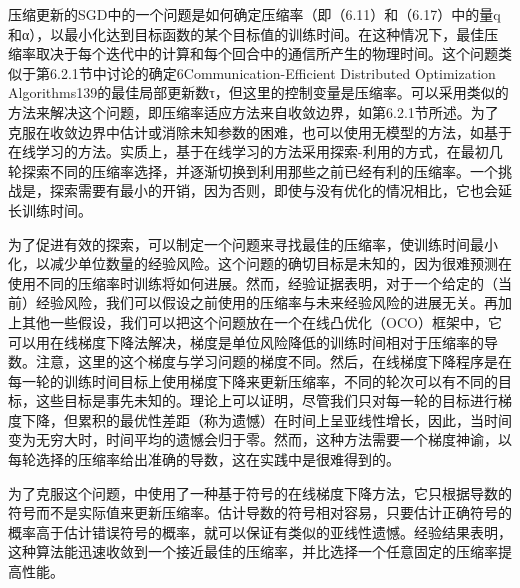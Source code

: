 {压缩更新的SGD中的一个问题是如何确定压缩率（即（6.11）和（6.17）中的量q和α），以最小化达到目标函数的某个目标值的训练时间。在这种情况下，最佳压缩率取决于每个迭代中的计算和每个回合中的通信所产生的物理时间。这个问题类似于第6.2.1节中讨论的确定6Communication-Efficient Distributed Optimization Algorithms139的最佳局部更新数τ，但这里的控制变量是压缩率。可以采用类似的方法来解决这个问题，即压缩率适应方法来自收敛边界，如第6.2.1节所述。为了克服在收敛边界中估计或消除未知参数的困难，也可以使用无模型的方法，如基于在线学习的方法。实质上，基于在线学习的方法采用探索-利用的方式，在最初几轮探索不同的压缩率选择，并逐渐切换到利用那些之前已经有利的压缩率。一个挑战是，探索需要有最小的开销，因为否则，即使与没有优化的情况相比，它也会延长训练时间。
	
为了促进有效的探索，可以制定一个问题来寻找最佳的压缩率，使训练时间最小化，以减少单位数量的经验风险。这个问题的确切目标是未知的，因为很难预测在使用不同的压缩率时训练将如何进展。然而，经验证据表明，对于一个给定的（当前）经验风险，我们可以假设之前使用的压缩率与未来经验风险的进展无关。再加上其他一些假设，我们可以把这个问题放在一个在线凸优化（OCO）框架中，它可以用在线梯度下降法解决，梯度是单位风险降低的训练时间相对于压缩率的导数。注意，这里的这个梯度与学习问题的梯度不同。然后，在线梯度下降程序是在每一轮的训练时间目标上使用梯度下降来更新压缩率，不同的轮次可以有不同的目标，这些目标是事先未知的。理论上可以证明，尽管我们只对每一轮的目标进行梯度下降，但累积的最优性差距（称为遗憾）在时间上呈亚线性增长，因此，当时间变为无穷大时，时间平均的遗憾会归于零。然而，这种方法需要一个梯度神谕，以每轮选择的压缩率给出准确的导数，这在实践中是很难得到的。
	
为了克服这个问题，中使用了一种基于符号的在线梯度下降方法，它只根据导数的符号而不是实际值来更新压缩率。估计导数的符号相对容易，只要估计正确符号的概率高于估计错误符号的概率，就可以保证有类似的亚线性遗憾。经验结果表明，这种算法能迅速收敛到一个接近最佳的压缩率，并比选择一个任意固定的压缩率提高性能。
	
}
